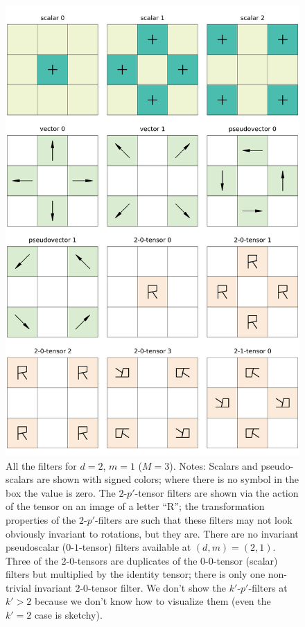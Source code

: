 \documentclass{article}
\theoremstyle{plain}
\begin{document}
\begin{figure}[tp]
  \begin{mdframed}
  \color{captiongray}
  \begin{center}
\includegraphics[width=\textwidth]{notebooks/filter_2_3.png}
  \end{center}
\caption{All the filters for $d=2$, $m=1$ ($M=3$).
Notes: Scalars and pseudo-scalars are shown with signed colors; where there is no symbol in the box the value is zero. The $2$-$p'$-tensor filters are shown via the action of the tensor on an image of a letter ``R''; the transformation properties of the $2$-$p'$-filters are such that these filters may not look obviously invariant to rotations, but they are.
There are no invariant pseudoscalar ($0$-$1$-tensor) filters available at $(d,m) = (2,1)$.
Three of the $2$-$0$-tensors are duplicates of the $0$-$0$-tensor (scalar) filters but multiplied by the identity tensor; there is only one non-trivial invariant $2$-$0$-tensor filter.
We don't show the $k'$-$p'$-filters at $k'>2$ because we don't know how to visualize them (even the $k'=2$ case is sketchy).\label{fig:filters23}}
  \end{mdframed}
\end{figure}
\end{document}

